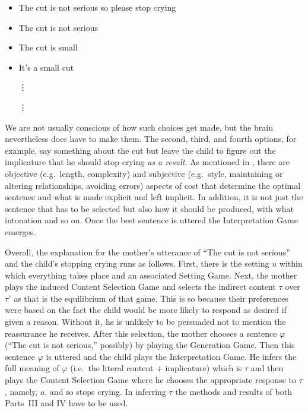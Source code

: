 \begin{itemize}

\item The cut is not serious so please stop crying

\item The cut is not serious

\item The cut is small

\item It's a small cut

\hspace{0.4in} \vdots 

\hspace{0.4in} \vdots

\end{itemize}

We are not usually conscious of how such choices get made, but the brain nevertheless does have to make them. The second, third, and fourth options, for example, say something about the cut but leave the child to figure out the implicature that he should stop crying \emph{as a result}. As mentioned in , there are objective (e.g.\ length, complexity) and subjective (e.g.\ style, maintaining or altering relationships, avoiding errors) aspects of cost that determine the optimal sentence and what is made explicit and left implicit. In addition, it is not just the sentence that has to be selected but also how it should be produced, with what intonation and so on. Once the best sentence is uttered the Interpretation Game emerges.

Overall, the explanation for the mother's utterance of ``The cut is not serious'' and the child's stopping crying runs as follows. First, there is the setting $u$ within which everything takes place and an associated Setting Game. Next, the mother plays the induced Content Selection Game and selects the indirect content $\tau$ over $\tau'$ as that is the equilibrium of that game. This is so because their preferences were based on the fact the child would be more likely to respond as desired if given a reason. Without it, he is unlikely to be persuaded not to mention the reassurance he receives. After this selection, the mother chooses a sentence $\varphi$ (``The cut is not serious,'' possibly) by playing the Generation Game. Then this sentence $\varphi$ is uttered and the child plays the Interpretation Game. He infers the full meaning of $\varphi$ (i.e.\ the literal content + implicature) which is $\tau$ and then plays the Content Selection Game where he chooses the appropriate response to $\tau$, namely, $a$, and so stops crying. In inferring $\tau$ the methods and results of both Parts~\textrm{III} and \textrm{IV} have to be used. 

